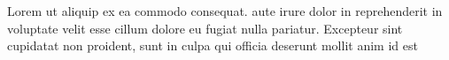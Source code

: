\documentclass{article}
\begin{document}
\renewcommand{\showlemma}[1]{\emph{#1}}
\beginnumbering
\pstart
Lorem  ut aliquip ex ea commodo consequat.  aute irure dolor in reprehenderit in voluptate velit esse cillum dolore eu fugiat nulla pariatur. Excepteur sint  cupidatat non proident, sunt in culpa qui officia deserunt mollit anim id est 
\pend
\endnumbering
\makeatletter

%
\end{document}

